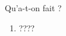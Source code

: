 \begin{multicols}{2}
\phantom{\emptybox\emptybox\emptybox\emptybox\emptybox\emptybox}%
	\head


\vfill\null
\columnbreak

\medskip %

\phantom{\emptybox\emptybox\emptybox\emptybox\emptybox\emptybox\emptybox}%
	\deah

\emptybox\emptybox%
\emptybox\emptybox

\emptybox\emptybox%
\emptybox\emptybox

\phantom{\emptybox\emptybox\emptybox\emptybox\emptybox\emptybox\emptybox}%
	\head


\medskip %

\phantom{\emptybox\emptybox\emptybox\emptybox\emptybox\emptybox\emptybox}%
	\deah

\emptybox\emptybox%
\emptybox\emptybox

\emptybox\emptybox%
\emptybox\emptybox

\phantom{\emptybox}%
	\head


\medskip %

\phantom{\emptybox\emptybox\emptybox\emptybox\emptybox\emptybox}%
	\deah

\emptybox\emptybox%
\emptybox\emptybox

\emptybox\emptybox%
\emptybox\emptybox

\phantom{\emptybox\emptybox}%
	\head


\medskip %

\phantom{\emptybox\emptybox\emptybox\emptybox\emptybox}%
	\deah

\emptybox\emptybox%
\emptybox\emptybox

\emptybox\emptybox%
\emptybox\emptybox

\phantom{\emptybox\emptybox\emptybox}%
	\head

\vfill\null
\end{multicols}


\vspace{-1em}

Qu'a-t-on fait ?
\begin{enumerate}
	\item ????
\end{enumerate}


